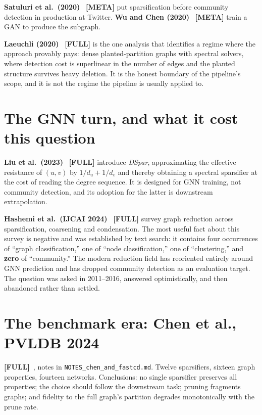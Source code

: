 \documentclass[10pt,a4paper]{article}
\begin{document}
\textbf{Satuluri et al.\ (2020)}~\cite{satuluri2020simclusters} \textbf{[META]} put
sparsification before community detection in production at Twitter.
\textbf{Wu and Chen (2020)}~\cite{wu2020gsgan} \textbf{[META]} train a GAN to produce the
subgraph.

\textbf{Laeuchli (2020)}~\cite{laeuchli2020fast} \textbf{[FULL]} is the one analysis that
identifies a regime where the approach provably pays: dense planted-partition graphs with
spectral solvers, where detection cost is superlinear in the number of edges and the planted
structure survives heavy deletion. It is the honest boundary of the pipeline's scope, and it is
not the regime the pipeline is usually applied to.

\section{The GNN turn, and what it cost this question}

\textbf{Liu et al.\ (2023)}~\cite{liu2023dspar} \textbf{[FULL]} introduce \emph{DSpar},
approximating the effective resistance of $(u,v)$ by $1/d_u + 1/d_v$ and thereby obtaining a
spectral sparsifier at the cost of reading the degree sequence. It is designed for GNN training,
not community detection, and its adoption for the latter is downstream extrapolation.

\textbf{Hashemi et al.\ (IJCAI 2024)}~\cite{hashemi2024survey} \textbf{[FULL]} survey graph
reduction across sparsification, coarsening and condensation. The most useful fact about this
survey is negative and was established by text search: it contains four occurrences of ``graph
classification,'' one of ``node classification,'' one of ``clustering,'' and \textbf{zero} of
``community.'' The modern reduction field has reoriented entirely around GNN prediction and has
dropped community detection as an evaluation target. The question was asked in 2011--2016,
answered optimistically, and then abandoned rather than settled.

\section{The benchmark era: Chen et al., PVLDB 2024}

\textbf{[FULL]}~\cite{chen2024demystifying}, notes in \texttt{NOTES\_chen\_and\_fastcd.md}.
Twelve sparsifiers, sixteen graph properties, fourteen networks. Conclusions: no single
sparsifier preserves all properties; the choice should follow the downstream task; pruning
fragments graphs; and fidelity to the full graph's partition degrades monotonically with the
prune rate.
\end{document}

